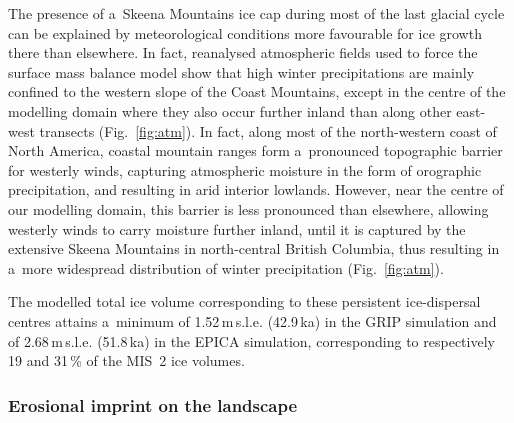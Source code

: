 \documentclass[tc, manuscript]{copernicus}
\begin{document}
      The presence of a~Skeena Mountains ice cap during most of the last
      glacial cycle can be explained by meteorological conditions more
      favourable for ice growth there than elsewhere. In fact, reanalysed
      atmospheric fields used to force the surface mass balance model show
      that high winter precipitations are mainly confined to the western
      slope of the Coast Mountains, except in the centre of the modelling
      domain where they also occur further inland than along other east-west
      transects (Fig.~\ref{fig:atm}). In fact, along most of the
      north-western coast of North America, coastal mountain ranges form
      a~pronounced topographic barrier for westerly winds, capturing
      atmospheric moisture in the form of orographic precipitation, and
      resulting in arid interior lowlands. However, near the centre of our
      modelling domain, this barrier is less pronounced than elsewhere,
      allowing westerly winds to carry moisture further inland, until it is
      captured by the extensive Skeena Mountains in north-central British
      Columbia, thus resulting in a~more widespread distribution of winter
      precipitation (Fig.~\ref{fig:atm}).

      The modelled total ice volume corresponding to these persistent
      ice-dispersal centres attains a~minimum of 1.52\,\unit{m}\,s.l.e.
      (42.9\,\unit{ka}) in the GRIP simulation and of 2.68\,\unit{m}\,s.l.e.
      (51.8\,\unit{ka}) in the EPICA simulation, corresponding to
      respectively 19 and 31\,\unit{\%} of the MIS~2 ice volumes.

\subsubsection{Erosional imprint on the landscape}
\end{document}

